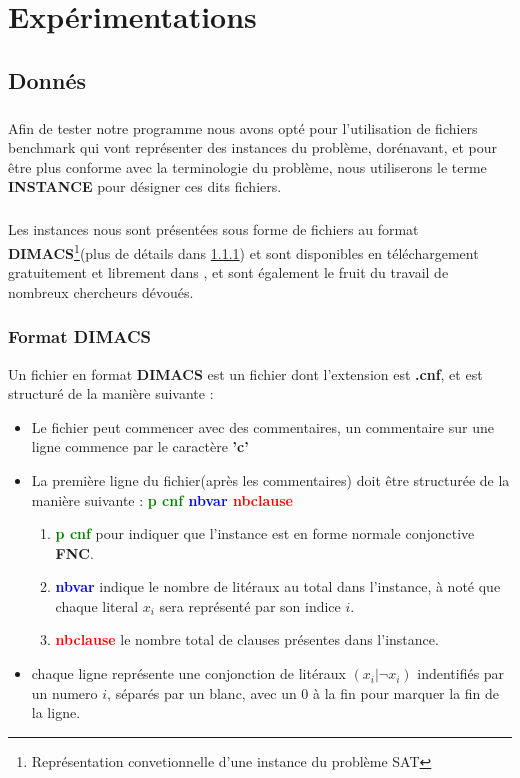 \chapter{Expérimentations}
\section{Donnés}\label{dataSet}
\paragraph{}Afin de tester notre programme nous avons opté pour l'utilisation de fichiers benchmark qui vont représenter des instances du problème, dorénavant, et pour être plus conforme avec la terminologie du problème, nous utiliserons le terme \textbf{INSTANCE} pour désigner ces dits fichiers.
\paragraph{}
Les instances nous sont présentées sous forme de fichiers au format \textbf{DIMACS}\footnote{Représentation convetionnelle d'une instance du problème SAT}(plus de détails dans \ref{par:dimacs}) et sont disponibles en téléchargement gratuitement et librement dans \cite{Benchmark}, et sont également le fruit du travail de nombreux chercheurs dévoués.
\subsection{Format DIMACS}\label{par:dimacs}
Un fichier en format \textbf{DIMACS} est un fichier dont l'extension est \textbf{.cnf}, et est structuré de la manière suivante : \\
\begin{itemize}
	\item Le fichier peut commencer avec des commentaires, un commentaire sur une ligne commence par le caractère \textbf{'c'}
	\item La première ligne du fichier(après les commentaires) doit être structurée de la manière suivante : \textbf{\textcolor{green}{p cnf} \textcolor{blue}{nbvar} \textcolor{red}{nbclause}}
	\begin{enumerate}
		\item \textbf{\textcolor{green}{p cnf}} pour indiquer que l'instance est en forme normale conjonctive \textbf{FNC}.
		\item \textbf{\textcolor{blue}{nbvar}} indique le nombre de litéraux au total dans l'instance, à noté que chaque literal $x_{i}$ sera représenté par son indice $i$.
		\item \textbf{\textcolor{red}{nbclause}} le nombre total de clauses présentes dans l'instance.
	\end{enumerate}
	\item chaque ligne représente une conjonction de litéraux $(x_{i} \vert \lnot x_{i})$ indentifiés par un numero $i$, séparés par un blanc, avec un 0 à la fin pour marquer la fin de la ligne.
\end{itemize}
